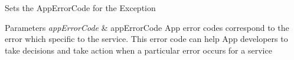 Sets the App\+Error\+Code for the Exception 


\begin{DoxyParams}{Parameters}
{\em app\+Error\+Code} & app\+Error\+Code App error codes correspond to the error which specific to the service. This error code can help App developers to take decisions and take action when a particular error occurs for a service \\
\hline
\end{DoxyParams}
